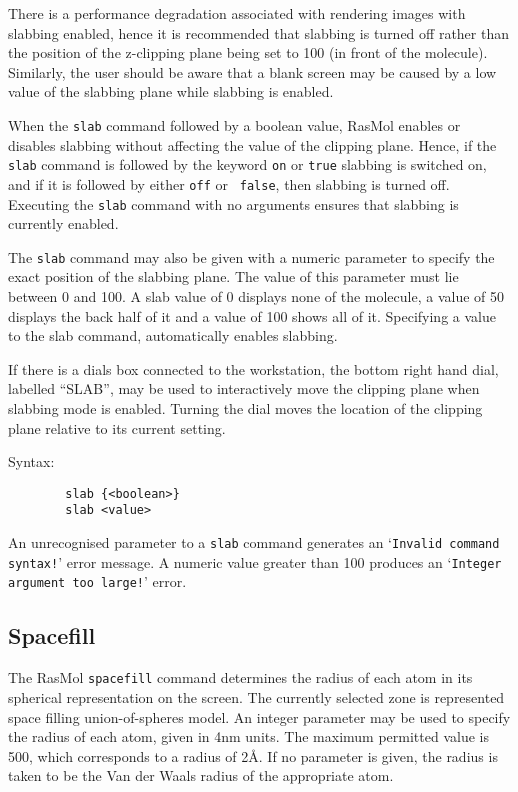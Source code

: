 There is a performance degradation associated with rendering images with 
slabbing enabled, hence it is recommended that slabbing is turned off rather
than the position of the z-clipping plane being set to 100 (in front of the 
molecule). Similarly, the user should be aware that a blank screen may be
caused by a low value of the slabbing plane while slabbing is enabled.

When the {\tt slab} command followed by a boolean value, RasMol enables or
disables slabbing without affecting the value of the clipping plane. Hence,
if the {\tt slab} command is followed by the keyword {\tt on} or {\tt true}
slabbing is switched on, and if it is followed by either {\tt off} or {\tt
false}, then slabbing is turned off. Executing the {\tt slab} command with 
no arguments ensures that slabbing is currently enabled.

The {\tt slab} command may also be given with a numeric parameter to specify
the exact position of the slabbing plane. The value of this parameter must
lie between 0 and 100. A slab value of 0 displays none of the molecule, a 
value of 50 displays the back half of it and a value of 100 shows all of it. 
Specifying a value to the slab command, automatically enables slabbing.

If there is a dials box connected to the workstation, the bottom right hand
dial, labelled ``SLAB'', may be used to interactively move the clipping plane
when slabbing mode is enabled. Turning the dial moves the location of the
clipping plane relative to its current setting. 


Syntax:
\begin{verbatim}
        slab {<boolean>}
        slab <value>
\end{verbatim}

An unrecognised parameter to a {\tt slab} command generates an `{\tt Invalid
command syntax!}' error message. A numeric value greater than 100 produces
an `{\tt Integer argument too large!}' error.


\subsection{Spacefill}
\label{CSpacefill}

The RasMol {\tt spacefill} command determines the radius of each atom in its
spherical representation on the screen. The currently selected zone is
represented space filling union-of-spheres model. An integer parameter may
be used to specify the radius of each atom, given in 4nm units. The maximum
permitted value is 500, which corresponds to a radius of 2\AA. If no 
parameter is given, the radius is taken to be the Van der Waals radius of
the appropriate atom.

